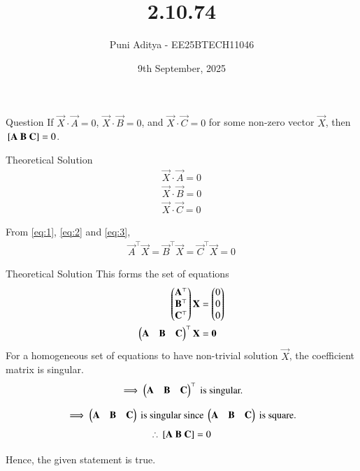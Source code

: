 \documentclass{beamer}
\title{2.10.74}
\date{9th September, 2025}
\author{Puni Aditya - EE25BTECH11046}
\begin{document}
\frame{\titlepage}
\begin{frame}{Question}
If $\vec{X} \cdot \vec{A} = 0$, $\vec{X} \cdot \vec{B} = 0$, and $\vec{X} \cdot \vec{C} = 0$ for some non-zero vector $\vec{X}$, then ${}\left[\mathbf{A}\ \mathbf{B}\ \mathbf{C}\right] = 0$.
\end{frame}

\begin{frame}{Theoretical Solution}
\begin{align}
    \vec{X} \cdot \vec{A} = 0 \label{eq:1} \\
    \vec{X} \cdot \vec{B} = 0 \label{eq:2} \\
    \vec{X} \cdot \vec{C} = 0 \label{eq:3}
\end{align}

From \eqref{eq:1}, \eqref{eq:2} and \eqref{eq:3},
\begin{align}
    \vec{A}^\top \vec{X} = \vec{B}^\top \vec{X} = \vec{C}^\top \vec{X} = 0
\end{align}
\end{frame}

\begin{frame}{Theoretical Solution}
This forms the set of equations
\begin{align}
    \begin{pmatrix}\mathbf{A}^\top \\ \mathbf{B}^\top \\ \mathbf{C}^\top\end{pmatrix} \mathbf{X} &= \begin{pmatrix}0 \\ 0 \\ 0\end{pmatrix} \\
    \begin{pmatrix}\mathbf{A} & \mathbf{B} & \mathbf{C}\end{pmatrix}^\top\mathbf{X} &= \mathbf{0}
\end{align}
For a homogeneous set of equations to have non-trivial solution $\vec{X}$, the coefficient matrix is singular.
\begin{align*}
    \implies \begin{pmatrix}\mathbf{A} & \mathbf{B} & \mathbf{C}\end{pmatrix}^\top\text{ is singular.}
\end{align*}

\begin{align*}
    \implies \begin{pmatrix}\mathbf{A} & \mathbf{B} & \mathbf{C}\end{pmatrix}\text{ is singular since }\begin{pmatrix}\mathbf{A} & \mathbf{B} & \mathbf{C}\end{pmatrix}\text{ is square.}
\end{align*}
\begin{align*}
    \therefore {}\left[\mathbf{A}\ \mathbf{B}\ \mathbf{C}\right] = 0
\end{align*}

Hence, the given statement is true. \\

\end{frame}
\end{document}
